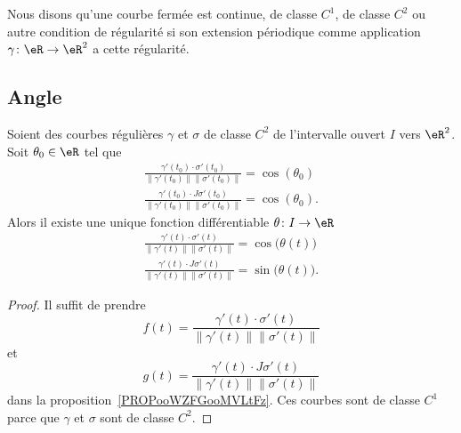 \begin{definition}      \label{DEFooSAZTooZGQrQG}
	Nous disons qu'une courbe fermée est continue, de classe \( C^1\), de classe \( C^2\) ou autre condition de régularité si son extension périodique comme application \( \gamma\colon \eR\to \eR^2\) a cette régularité.
\end{definition}

\subsection{Angle}

\begin{lemma}        \label{LEMooUECMooNBDGiR}
	Soient des courbes régulières \( \gamma\) et \( \sigma\) de classe \( C^2\) de l'intervalle ouvert \( I\) vers \( \eR^2\). Soit \( \theta_0\in \eR\) tel que
	\begin{subequations}
		\begin{align}
			\frac{ \gamma'(t_0)\cdot\sigma'(t_0) }{ \| \gamma'(t_0) \|\| \sigma'(t_0) \| }=\cos(\theta_0) \\
			\frac{ \gamma'(t_0)\cdot J\sigma'(t_0) }{ \| \gamma'(t_0) \|\| \sigma'(t_0) \| }=\cos(\theta_0).
		\end{align}
	\end{subequations}
	Alors il existe une unique fonction différentiable \( \theta\colon I\to \eR\)
	\begin{subequations}
		\begin{align}
			\frac{ \gamma'(t)\cdot\sigma'(t) }{ \| \gamma'(t) \|\| \sigma'(t) \| }=\cos\big( \theta(t) \big) \\
			\frac{ \gamma'(t)\cdot J\sigma'(t) }{ \| \gamma'(t) \|\| \sigma'(t) \| }=\sin\big( \theta(t) \big).
		\end{align}
	\end{subequations}
\end{lemma}

\begin{proof}
	Il suffit de prendre
	\begin{equation}
		f(t)=\frac{ \gamma'(t)\cdot\sigma'(t) }{ \| \gamma'(t) \|\| \sigma'(t) \| }
	\end{equation}
	et
	\begin{equation}
		g(t)=\frac{ \gamma'(t)\cdot J\sigma'(t) }{ \| \gamma'(t) \|\| \sigma'(t) \| }
	\end{equation}
	dans la proposition~\ref{PROPooWZFGooMVLtFz}. Ces courbes sont de classe \( C^1\) parce que \( \gamma\) et \( \sigma\) sont de classe \( C^2\).
\end{proof}

